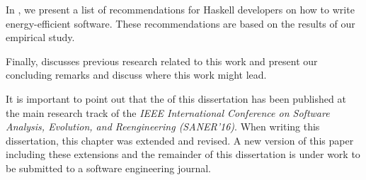In \textbf{}, we present a list of recommendations for Haskell developers on how to write energy-efficient software. These recommendations are based on the results of our empirical study.

Finally, \textbf{} discusses previous research related to this work and \textbf{} present our concluding remarks and discuss where this work might lead.

It is important to point out that the \textbf{} of this dissertation has been published at the main research track of the \emph{IEEE International Conference on Software Analysis, Evolution, and Reengineering (SANER'16)}. When writing this dissertation, this chapter was extended and revised. A new version of this paper including these extensions and the remainder of this dissertation is under work to be submitted to a software engineering journal.
